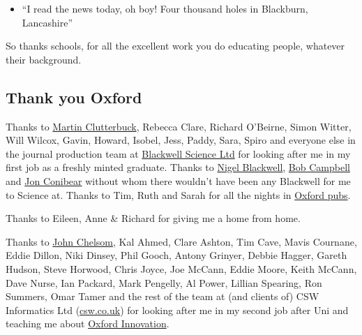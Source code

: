 \documentclass[
]{book}
\providecommand{\tightlist}{%
  \setlength{\itemsep}{0pt}\setlength{\parskip}{0pt}}
\begin{document}
\begin{itemize}
  \begin{itemize}
  \tightlist
  \item
    ``I read the news today, oh boy! Four thousand holes in Blackburn, Lancashire'' \citep{adayinthelife}
  \end{itemize}
\end{itemize}

So thanks schools, for all the excellent work you do educating people, whatever their background. 🙏

\hypertarget{oxford}{%
\subsection{Thank you Oxford}\label{oxford}}

Thanks to \href{https://shabash.net/about}{Martin Clutterbuck}, Rebecca Clare, Richard O'Beirne, Simon Witter, Will Wilcox, Gavin, Howard, Isobel, Jess, Paddy, Sara, Spiro and everyone else in the journal production team at \href{https://www.flickr.com/photos/dullhunk/4042838703}{Blackwell Science Ltd} for looking after me in my first job as a freshly minted graduate. Thanks to \href{https://find-and-update.company-information.service.gov.uk/officers/bhikqaOvDcqoeBx4ADdYbmM9OJk/appointments}{Nigel Blackwell}, \href{https://find-and-update.company-information.service.gov.uk/officers/eKDez4M2z_A_ASdhMSFPyYA7AxE/appointments}{Bob Campbell} and \href{https://find-and-update.company-information.service.gov.uk/officers/FMl8qqZCrsq8NHF_rbCdx_3TQR4/appointments}{Jon Conibear} without whom there wouldn't have been any Blackwell for me to Science at. Thanks to Tim, Ruth and Sarah for all the nights in \href{https://www.flickr.com/photos/dullhunk/3947383855}{Oxford pubs}.

Thanks to Eileen, Anne \& Richard for giving me a home from home.

Thanks to \href{https://www.fordham.edu/info/30585/ms_in_applied_health_informatics_faculty}{John Chelsom}, Kal Ahmed, Clare Ashton, Tim Cave, Mavis Cournane, Eddie Dillon, Niki Dinsey, Phil Gooch, Antony Grinyer, Debbie Hagger, Gareth Hudson, Steve Horwood, Chris Joyce, Joe McCann, Eddie Moore, Keith McCann, Dave Nurse, Ian Packard, Mark Pengelly, Al Power, Lillian Spearing, Ron Summers, Omar Tamer and the rest of the team at (and clients of) CSW Informatics Ltd (\href{https://csw.co.uk/}{csw.co.uk}) for looking after me in my second job after Uni and teaching me about \href{https://oxin-centres.co.uk/}{Oxford Innovation}.
\end{document}
